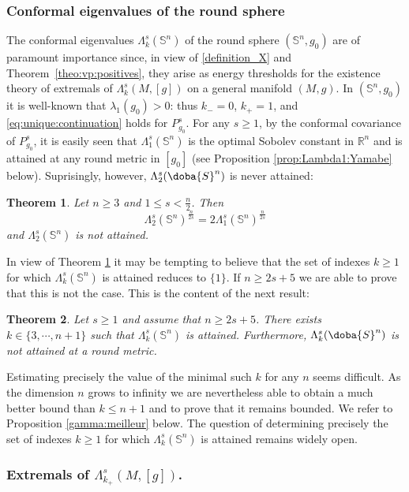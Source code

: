 \documentclass[10pt]{amsart}
\numberwithin{equation}{section}
\newcommand{\R}{\mathbb{R}}
\def\La{{\Lambda}}
\gdef\mS{\doba{S}}
\theoremstyle{plain}
\newtheorem{theo}{Theorem}[section]%
\theoremstyle{remark}
\begin{document}
\subsubsection{Conformal eigenvalues of the round sphere}


The conformal eigenvalues $\Lambda_k^s(\mathbb{S}^n)$ of the round sphere $(\mathbb{S}^n, g_0)$ are of paramount importance since, in view of \eqref{definition_X} and Theorem~\ref{theo:vp:positives}, they arise as energy thresholds for the existence theory of extremals of $\Lambda_k^s(M,[g])$ on a general manifold $(M,g)$. In $(\mathbb{S}^n, g_0)$ it is well-known that $\lambda_1(g_0) >0$: thus $k_- = 0$, $k_+=1$, and \eqref{eq:unique:continuation} holds for $P_{g_0}^s$. For any $s \ge 1$, by the conformal covariance of $P_{g_0}^s$, it is easily seen that $\Lambda_1^s(\mathbb{S}^n)$ is the optimal Sobolev constant in $\R^n$ and is attained at any round metric in $[g_0]$ (see Proposition \ref{prop:Lambda1:Yamabe} below). Suprisingly, however, $\Lambda_2^s(\mS^n)$ is never attained: 
 
\begin{theo} \label{lambda2:sphere}
Let $n \ge 3$ and $1 \le s < \frac{n}{2}$. Then 
$$ \Lambda_2^s(\mathbb{S}^n)^{\frac{n}{2s}} = 2 \Lambda_1^s(\mathbb{S}^n)^{\frac{n}{2s}} $$
and $\Lambda_2^s(\mathbb{S}^n)$ is not attained.  
\end{theo}
In view of Theorem \ref{lambda2:sphere} it may be tempting to believe that the set of indexes $k \ge 1$ for which $\Lambda_k^s(\mathbb{S}^n)$ is attained reduces to $\{1\}$. If $n \ge 2s+5$ we are able to prove that this is not the case. This is the content of the next result:
\begin{theo} \label{gamma}
Let $s \ge 1$ and assume that $n \ge 2s + 5$. There exists $k \in \{3, \cdots, n+1\}$ such that $\Lambda_k^s(\mathbb{S}^n)$ is attained. Furthermore, $\La_{k}^s(\mS^n)$ is not attained at a round metric.
\end{theo}
Estimating precisely the value of the minimal such $k$ for any $n$ seems difficult. As the dimension $n$ grows to infinity we are nevertheless able to obtain a much better bound than $k \le n+1$ and to prove that it remains bounded. We refer to Proposition \ref{gamma:meilleur} below. The question of determining precisely the set of indexes $k \ge 1$ for which $\Lambda_k^s(\mathbb{S}^n)$ is attained remains widely open.


\subsubsection{Extremals of  $\Lambda_{k_+}^s(M,[g])$.}
\end{document}
